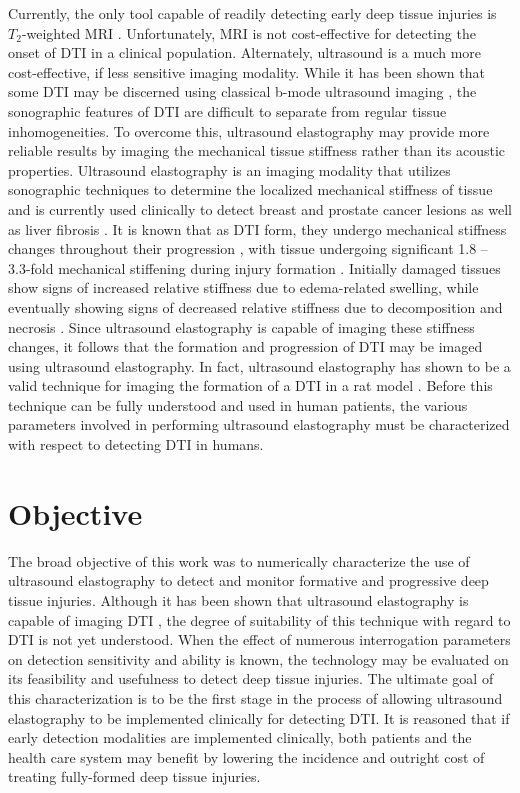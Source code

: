 		Currently, the only tool capable of readily detecting early deep tissue injuries is $T_2$-weighted MRI \cite{stekelenburg06,loerakker11}. Unfortunately, MRI is not cost-effective for detecting the onset of DTI in a clinical population. Alternately, ultrasound is a much more cost-effective, if less sensitive imaging modality. While it has been shown that some DTI may be discerned using classical b-mode ultrasound imaging \cite{aoi08, kanno09}, the sonographic features of DTI are difficult to separate from regular tissue inhomogeneities. To overcome this, ultrasound elastography may provide more reliable results by imaging the mechanical tissue stiffness rather than its acoustic properties. Ultrasound elastography is an imaging modality that utilizes sonographic techniques to determine the localized mechanical stiffness of tissue and is currently used clinically to detect breast and prostate cancer lesions \cite{tanter08, konig05} as well as liver fibrosis \cite{sandrin03}. It is known that as DTI form, they undergo mechanical stiffness changes throughout their progression \cite{linderganz04,oomens10,solis12-03}, with tissue undergoing significant 1.8 -- 3.3-fold mechanical stiffening during injury formation \cite{gefen05}. Initially damaged tissues show signs of increased relative stiffness due to edema-related swelling, while eventually showing signs of decreased relative stiffness due to decomposition and necrosis \cite{gefen09}. Since ultrasound elastography is capable of imaging these stiffness changes, it follows that the formation and progression of DTI may be imaged using ultrasound elastography. In fact, ultrasound elastography has shown to be a valid technique for imaging the formation of a DTI in a rat model \cite{deprez11}. Before this technique can be fully understood and used in human patients, the various parameters involved in performing ultrasound elastography must be characterized with respect to detecting DTI in humans.

	\section{Objective}
		The broad objective of this work was to numerically characterize the use of ultrasound elastography to detect and monitor formative and progressive deep tissue injuries. Although it has been shown that ultrasound elastography is capable of imaging DTI \cite{deprez11}, the degree of suitability of this technique with regard to DTI is not yet understood. When the effect of numerous interrogation parameters on detection sensitivity and ability is known, the technology may be evaluated on its feasibility and usefulness to detect deep tissue injuries. The ultimate goal of this characterization is to be the first stage in the process of allowing ultrasound elastography to be implemented clinically for detecting DTI. It is reasoned that if early detection modalities are implemented clinically, both patients and the health care system may benefit by lowering the incidence and outright cost of treating fully-formed deep tissue injuries.

